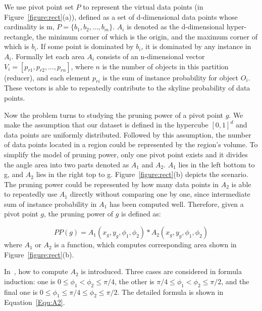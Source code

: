We use pivot point set $P$ to represent the virtual data points (in Figure~\ref{figure:rect}(a)), defined as a set of d-dimensional data points whose cardinality is m, $P=\{b_1, b_2, \dots, b_m\}$. $A_i$ is denoted as the d-dimensional hyper-rectangle, the minimum corner of which is the origin, and the maximum corner of which is $b_i$. If some point is dominated by $b_i$, it is dominated by any instance in $A_i$. Formally let each area $A_i$ consists of an n-dimensional vector $V_i = [p_{r1}, p_{r2}, \dots, p_{rn}]$, where $n$ is the number of objects in this partition (reducer), and each element $p_{ri}$ is the sum of instance probability for object $O_i$. These vectors is able to repeatedly contribute to the skyline probability of data points.  



Now the problem turns to studying the pruning power of a pivot point $g$. We make the assumption that our dataset is defined in the hypercube $[0,1]^d$ and data points are uniformly distributed. Followed by this assumption, the number of data points located in a region could be represented by the region's volume. To simplify the model of pruning power, only one pivot point exists and it divides the angle area into two parts denoted as $A_1$ and $A_2$. $A_1$ lies in the left bottom to g, and $A_2$ lies in the right top to g. Figure~\ref{figure:rect}(b) depicts the scenario. The pruning power could be represented by how many data points in $A_2$ is able to repeatedly use $A_1$ directly without comparing one by one, since intermediate sum of instance probability in $A_1$ has been computed well. Therefore, given a pivot point $g$, the pruning power of $g$ is defined as:

\begin{equation}
PP(g) = A_1(x_g, y_g, \phi_1, \phi_2) * A_2(x_g, y_g, \phi_1, \phi_2)
\end{equation}
where $A_1$ or $A_2$ is a function, which computes corresponding area shown in Figure~\ref{figure:rect}(b).

In~\cite{ref:AngularPartition}, how to compute $A_2$ is introduced. Three cases are considered in formula induction: one is $0 \leq \phi_1 < \phi_2 \leq \pi/4$, the other is $\pi/4 \leq \phi_1 < \phi_2 \leq \pi/2$, and the final one is $0 \leq \phi_1 \leq \pi/4 \le \phi_2 \leq \pi/2$. The detailed formula is shown in Equation~\ref{Equ:A2}.


